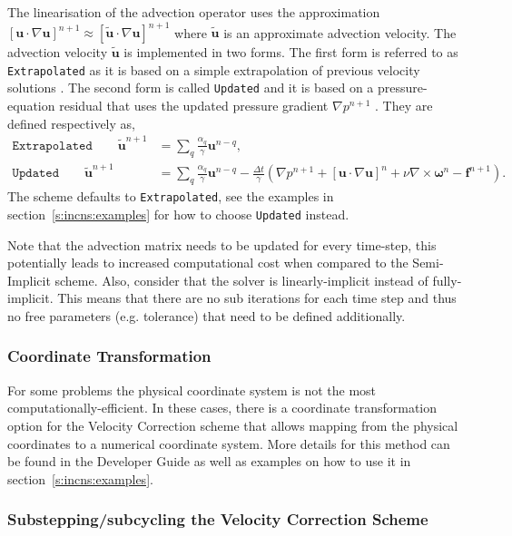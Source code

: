 The linearisation of the advection operator uses the 
approximation $[\mathbf{u} \cdot \nabla \mathbf{u}]^{n+1} \approx 
[\tilde{\mathbf{u}} \cdot \nabla \mathbf{u}]^{n+1}$ where $\tilde{\mathbf{u}}$
is an approximate advection velocity.
The advection velocity $\tilde{\mathbf{u}}$ is implemented in two forms.
The first form is referred to as \texttt{Extrapolated} as it is 
based on a simple extrapolation of previous velocity solutions \cite{Simo1994}.
The second form is called \texttt{Updated} and it is based on a 
pressure-equation residual that uses the updated pressure gradient $\nabla p^{n+1}$ \cite{Dong2010}.
They are defined respectively as,
\begin{align}
    \texttt{Extrapolated}\qquad\tilde{\mathbf{u}}^{n+1} &=
    \sum_q \frac{\alpha_q}{\gamma} \mathbf{u}^{n-q},\\
    \texttt{Updated}\qquad\tilde{\mathbf{u}}^{n+1} &=
    \sum_q \frac{\alpha_q}{\gamma} \mathbf{u}^{n-q} 
    - \frac{\Delta t}{\gamma} \left(
    \nabla p^{n+1}
    + [\mathbf{u} \cdot \nabla \mathbf{u}]^{n} 
    + \nu \nabla \times \mathbf{\omega}^{n}
    - \mathbf{f}^{n+1} \right).
\end{align}
The scheme defaults to \texttt{Extrapolated}, see 
the examples in section~\ref{s:incns:examples} for 
how to choose \texttt{Updated} instead.

Note that the advection matrix needs to be
updated for every time-step, this potentially leads to increased
computational cost when compared to the Semi-Implicit scheme.
Also, consider that the solver is linearly-implicit instead of fully-implicit.
This means that there are no sub iterations for each time step and 
thus no free parameters (e.g. tolerance) that need to be defined additionally.


\subsubsection{Coordinate Transformation}
\label{VCSCoordinateTransformation}
For some problems the physical coordinate system is not the most computationally-efficient.
In these cases, there is a coordinate transformation option for the Velocity Correction scheme that allows
mapping from the physical coordinates to a numerical coordinate system.
More details for this method can be found in the Developer Guide as well as examples on how to use it in section~\ref{s:incns:examples}.

\subsubsection{Substepping/subcycling the Velocity Correction Scheme}

